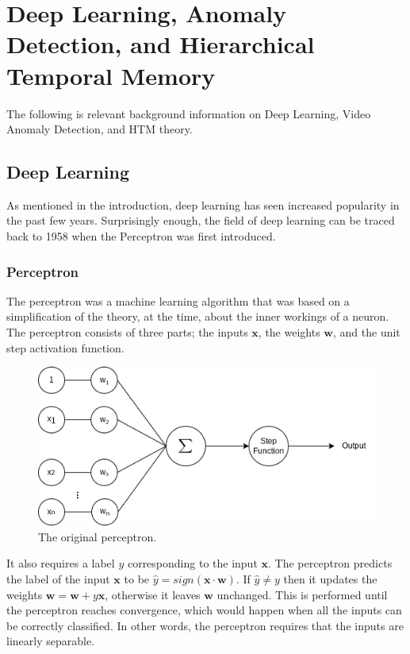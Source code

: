 \chapter{Deep Learning, Anomaly Detection, and Hierarchical Temporal Memory}
\label{sec:background}
The following is relevant background information on Deep Learning, Video Anomaly Detection, and HTM theory.
\section{Deep Learning}
As mentioned in the introduction, deep learning has seen increased popularity in the past few years. Surprisingly enough, the field of deep learning can be traced back to 1958 when the Perceptron\cite{perceptron,perceptron2} was first introduced.
\subsection{Perceptron}
The perceptron\cite{perceptron, perceptron2} was a machine learning algorithm that was based on a simplification of the theory, at the time, about the inner workings of a neuron. The perceptron consists of three parts; the inputs $\mathbf{x}$, the weights $\mathbf{w}$, and the unit step activation function.
\begin{figure}[H]
    \centering
    \includegraphics[width=\linewidth]{resources/related_works/perceptron}
    \caption[The Original Perceptron]{The original perceptron.}
\end{figure}
It also requires a label $y$ corresponding to the input $\mathbf{x}$. The perceptron predicts the label of the input $\mathbf{x}$ to be $\hat{y}=sign(\mathbf{x}\cdot\mathbf{w})$. If $\hat{y}\neq y$ then it updates the weights $\mathbf{w}=\mathbf{w}+y\mathbf{x}$, otherwise it leaves $\mathbf{w}$ unchanged. This is performed until the perceptron reaches convergence, which would happen when all the inputs can be correctly classified. In other words, the perceptron requires that the inputs are linearly separable.
